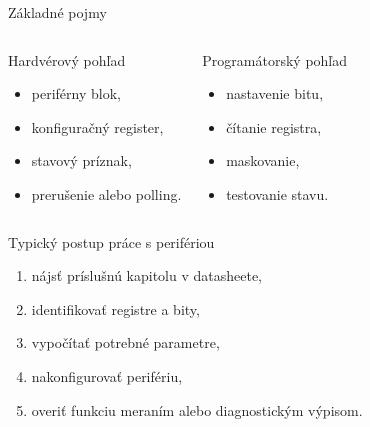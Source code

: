 
\begin{frame}{Základné pojmy}
\begin{columns}[T,onlytextwidth]
\begin{tukebox}{Hardvérový pohľad}
\begin{itemize}
    \item periférny blok,
    \item konfiguračný register,
    \item stavový príznak,
    \item prerušenie alebo polling.
\end{itemize}
\end{tukebox}
\begin{tukebox}{Programátorský pohľad}
\begin{itemize}
    \item nastavenie bitu,
    \item čítanie registra,
    \item maskovanie,
    \item testovanie stavu.
\end{itemize}
\end{tukebox}
\end{columns}
\end{frame}

\begin{frame}{Typický postup práce s perifériou}
\begin{enumerate}
    \item nájsť príslušnú kapitolu v datasheete,
    \item identifikovať registre a bity,
    \item vypočítať potrebné parametre,
    \item nakonfigurovať perifériu,
    \item overiť funkciu meraním alebo diagnostickým výpisom.
\end{enumerate}
\end{frame}
